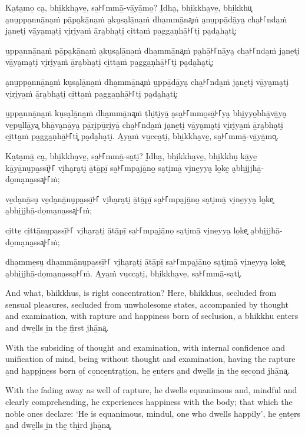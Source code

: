 Ka̮ta̮mo̱ ca̮, bhi̱kkha̮ve̱, sa̱꜔꜒mmā̱-vā̱yā̱mo̱? I̮dha̮, bhi̱kkha̮ve̱, bhi̱kkhu͓
a̮nu̱ppa̱nnā̱na̱ṁ pā̱pa̮kā̱na̱ṁ a̮ku̮sa̮lā̱na̱ṁ dha̱mmā̱na͓ṁ
a̮nu̱ppā̱dā̱ya̮ cha̱꜔꜒nda̱ṁ ja̮ne̱ti̮ vā̱ya̮ma̮ti̮ vi̮ri̮ya̱ṁ ā̱ra̮bha̮ti̮ ci̱tta̱ṁ pa̱gga̱ṇhā̱꜔꜒ti̮ pa̮da̮ha̮ti͓;

u̱ppa̱nnā̱na̱ṁ pā̱pa̮kā̱na̱ṁ a̮ku̮sa̮lā̱na̱ṁ dha̱mmā̱na͓ṁ
pa̮hā̱꜔꜒nā̱ya̮ cha̱꜔꜒nda̱ṁ ja̮ne̱ti̮ vā̱ya̮ma̮ti̮ vi̮ri̮ya̱ṁ ā̱ra̮bha̮ti̮ ci̱tta̱ṁ pa̱gga̱ṇhā̱꜔꜒ti̮ pa̮da̮ha̮ti͓;

a̮nu̱ppa̱nnā̱na̱ṁ ku̮sa̮lā̱na̱ṁ dha̱mmā̱na͓ṁ
u̱ppā̱dā̱ya̮ cha̱꜔꜒nda̱ṁ ja̮ne̱ti̮ vā̱ya̮ma̮ti̮ vi̮ri̮ya̱ṁ ā̱ra̮bha̮ti̮ ci̱tta̱ṁ pa̱gga̱ṇhā̱꜔꜒ti̮ pa̮da̮ha̮ti͓;

u̱ppa̱nnā̱na̱ṁ ku̮sa̮lā̱na̱ṁ dha̱mmā̱na͓ṁ
ṭhi̮ti̮yā̱ a̮sa̱꜔꜒mmo̱sā̱꜔꜒ya̮ bhi̱yyo̱bhā̱vā̱ya̮ ve̱pu̱llā̱ya͓
bhā̱va̮nā̱ya̮ pā̱ri̮pū̱ri̮yā̱ cha̱꜔꜒nda̱ṁ ja̮ne̱ti̮ vā̱ya̮ma̮ti̮ vi̮ri̮ya̱ṁ ā̱ra̮bha̮ti̮ ci̱tta̱ṁ pa̱gga̱ṇhā̱꜔꜒ti͓
pa̮da̮ha̮ti̮. A̮ya̱ṁ vu̱cca̮ti̮, bhi̱kkha̮ve̱, sa̱꜔꜒mmā̱-vā̱yā̱mo͓.

Ka̮ta̮mā̱ ca̮, bhi̱kkha̮ve̱, sa̱꜔꜒mmā̱-sa̮ti̮? I̮dha̮, bhi̱kkha̮ve̱, bhi̱kkhu̮ kā̱ye̱ kā̱yā̱nu̮pa̱ssī͓꜔꜒
vi̮ha̮ra̮ti̮ ā̱tā̱pī̱ sa̱꜔꜒mpa̮jā̱no̱ sa̮ti̮mā̱ vi̮ne̱yya̮ lo̱ke̱ a̮bhi̱jjhā̱-do̱ma̮na̱ssa͓꜔꜒ṁ;

ve̱da̮nā̱su̮ ve̱da̮nā̱nu̮pa̱ssī̱꜔꜒ vi̮ha̮ra̮ti̮ ā̱tā̱pī̱ sa̱꜔꜒mpa̮jā̱no̱ sa̮ti̮mā̱ vi̮ne̱yya̮ lo̱ke͓
a̮bhi̱jjhā̱-do̱ma̮na̱ssa͓꜔꜒ṁ;

\enlargethispage{\baselineskip}

ci̱tte̱ ci̱ttā̱nu̮pa̱ssī̱꜔꜒ vi̮ha̮ra̮ti̮ ā̱tā̱pī̱ sa̱꜔꜒mpa̮jā̱no̱ sa̮ti̮mā̱ vi̮ne̱yya̮ lo̱ke͓
a̮bhi̱jjhā̱-do̱ma̮na̱ssa͓꜔꜒ṁ;

dha̱mme̱su̮ dha̱mmā̱nu̮pa̱ssī̱꜔꜒ vi̮ha̮ra̮ti̮ ā̱tā̱pī̱ sa̱꜔꜒mpa̮jā̱no̱ sa̮ti̮mā̱ vi̮ne̱yya̮ lo̱ke͓
a̮bhi̱jjhā̱-do̱ma̮na̱ssa̱꜔꜒ṁ. A̮ya̱ṁ vu̱cca̮ti̮, bhi̱kkha̮ve̱, sa̱꜔꜒mmā̱-sa̮ti͓.

\englishPage

And what, bhikkhus, is right concentration? Here, bhikkhus, secluded from
sensual pleasures, secluded from unwholesome states, accompanied by thought and
examination, with rapture and happiness born of seclusion, a bhikkhu enters and
dwe̱lls i̱n the̱ fi̱rst jhā̱na͓.

With the subsiding of thought and examination, with internal confidence and
unification of mind, being without thought and examination, having the rapture
a̱nd ha̱ppi̮ne̱ss bo̱rn o̱f co̱nce̱ntra̮ti̱o̱n, he̱ e̱nte̱rs a̱nd dwe̱lls i̱n the̱ se̱co̱nd jhā̱na͓.

With the fading away as well of rapture, he dwells equanimous and, mindful and
clearly comprehending, he experiences happiness with the body; that which the
noble ones declare: `He is equanimous, mindul, one who dwells happily', he
e̱nte̱rs a̱nd dwe̱lls i̱n the̱ thi̱rd jhā̱na͓.


